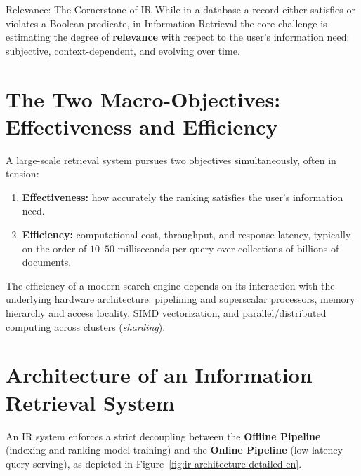 \begin{alertblock}{Relevance: The Cornerstone of IR}
While in a database a record either satisfies or violates a Boolean predicate, in Information Retrieval the core challenge is estimating the degree of \textbf{relevance} with respect to the user's information need: subjective, context-dependent, and evolving over time.
\end{alertblock}

\FloatBarrier
\section{The Two Macro-Objectives: Effectiveness and Efficiency}

A large-scale retrieval system pursues two objectives simultaneously, often in tension:
\begin{enumerate}
    \item \textbf{Effectiveness:} how accurately the ranking satisfies the user's information need.
    \item \textbf{Efficiency:} computational cost, throughput, and response latency, typically on the order of $10$--$50$ milliseconds per query over collections of billions of documents.
\end{enumerate}

The efficiency of a modern search engine depends on its interaction with the underlying hardware architecture: pipelining and superscalar processors, memory hierarchy and access locality, SIMD vectorization, and parallel/distributed computing across clusters (\textit{sharding}).

\FloatBarrier
\section{Architecture of an Information Retrieval System}

An IR system enforces a strict decoupling between the \textbf{Offline Pipeline} (indexing and ranking model training) and the \textbf{Online Pipeline} (low-latency query serving), as depicted in Figure~\ref{fig:ir-architecture-detailed-en}.

